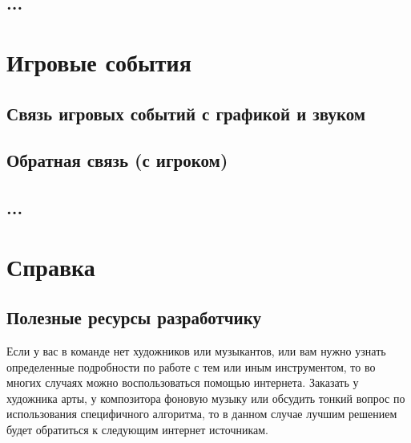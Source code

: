 \section{...}

\chapter{Игровые события}
\section{Связь игровых событий с графикой и звуком}
\section{Обратная связь (с игроком)}
\section{...}

\chapter{Справка}
\section{Полезные ресурсы разработчику}
Если у вас в команде нет художников или музыкантов, или вам нужно узнать определенные подробности по работе с тем или иным инструментом, то во многих случаях 
можно воспользоваться помощью интернета. Заказать у художника арты, у композитора фоновую музыку или обсудить тонкий вопрос по использования специфичного 
алгоритма, то в данном случае лучшим решением будет обратиться к следующим интернет источникам.

